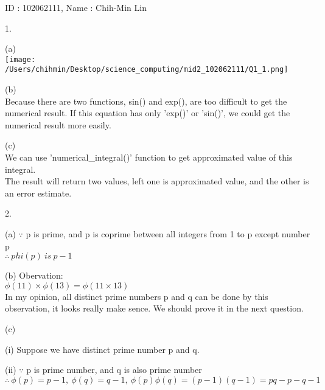 \documentclass{article}
\begin{document}
  \begin{enumerate*}
    \item []
    ID : 102062111, Name : Chih-Min Lin

    \item [1.]
    \begin{enumerate*}  
      \item [(a)] \text{}\\
      \texttt{[image: /Users/chihmin/Desktop/science\_computing/mid2\_102062111/Q1\_1.png]}

	  \item [(b)] \text{}\\ 
      Because there are two functions, sin() and exp(), are too difficult to get the numerical result. If this equation has only 'exp()' or 'sin()', we could get the numerical result more easily.   
      
      \item [(c)] \text{}\\
      We can use 'numerical\_integral()' function to get approximated value of this integral. \\
      The result will return two values, left one is approximated value, and the other is an error estimate.

    \end{enumerate*}
    
    \item [2.]
    \begin{enumerate*}
      \item [(a)]
      $\because$ p is prime, and p is coprime between all integers from 1 to p except number p \\
      $\therefore \ phi(p)\ is\ p-1$ 
      
      \item [(b)]
      Obervation: \\
      $\phi(11) \times \phi(13) = \phi(11 \times 13)$ \\
      In my opinion, all distinct prime numbers p and q can be done by this observation, it looks really make sence. We should prove it in the next question.
      
      \item [(c)]
        \ 
        \begin{enumerate*}
          \item [(i)]
          Suppose we have distinct prime number p and q.
          \\

          \item [(ii)]
          $\because$ p is prime number, and q is also prime number \\
          $\therefore\ \phi(p) = p-1,\ \phi(q) = q-1,\ \phi(p)\phi(q)=(p-1)(q-1) = pq-p-q-1$
          \\


\end{enumerate*}
\end{enumerate*}
\end{enumerate*}
\end{document}

